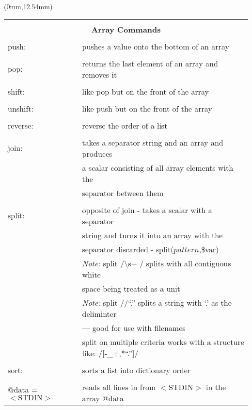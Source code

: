 \documentclass[10pt]{article}
\begin{document}
\begin{textblock*}{100mm}(0mm,12.54mm)
\begin{tabular*}{100mm}{l @{\extracolsep{\fill}} l}
                & \\
\multicolumn{2}{c}{\bf Array Commands} \\
                & \\
push:           & pushes a value onto the bottom of an array\\
                & \\
pop:            & returns the last element of an array and removes it\\
                & \\
shift:          & like pop but on the front of the array\\
                & \\
unshift:        & like push but on the front of the array\\
                & \\
reverse:        & reverse the order of a list\\
                & \\
join:           & takes a separator string and an array and produces\\
                & a scalar consisting of all array elements with the\\
			    & separator between them\\
                & \\
split:          & opposite of join - takes a scalar with a separator\\
                & string and turns it into an array with the\\
			    & separator discarded - split($pattern$,\$var)\\
				& \emph{Note:} split /\textbackslash s+ / splits with all contiguous white\\
				& space being treated as a unit\\
                & \emph{Note:} split //``.'' splits a string with `.' as the deliminter\\
				& --- good for use with filenames\\
				& split on multiple criteria works with a structure like: /[-\_+,*``.'']/\\
                & \\
sort:           & sorts a list into dictionary order\\
                & \\
@data = $<\mbox{STDIN}>$   & reads all lines in from $< \mbox{STDIN} >$ in the array @data\\

\end{tabular*}
\end{textblock*}
\end{document}
